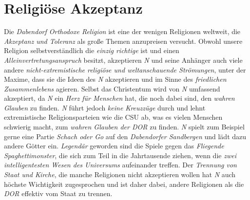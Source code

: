 \section{{Religiöse Akzeptanz}}
Die \textit{Dabendorf Orthodoxe Religion} ist eine der wenigen Religionen weltweit, die \textit{Akzeptanz und Toleranz} als große Themen anzupreisen versucht. Obwohl unsere Religion selbstverständlich die \textit{einzig richtige} ist und einen \textit{Alleinvertretungsanspruch} besitzt, akzeptieren \textit{N} und seine Anhänger auch viele andere \textit{nicht-extremistische religiöse und weltanschauende Strömungen}, unter der Maxime, dass sie die Ideen des \textit{N} akzeptieren und im Sinne des \textit{friedlichen Zusammenlebens} agieren. Selbst das Christentum wird von \textit{N} umfassend akzeptiert, da \textit{N} ein \textit{Herz für Menschen} hat, die noch dabei sind, den \textit{wahren Glauben} zu finden. \textit{N} führt jedoch \textit{keine Kreuzzüge} durch und lehnt extremistische Religionsparteien wie die CSU ab, was es vielen Menschen schwierig macht, zum \textit{wahren Glauben der DOR} zu finden. \textit{N} spielt zum Beispiel gerne eine Partie \textit{Schach oder Go} auf den \textit{Dabendorfer Sandbergen} und lädt dazu andere Götter ein. \textit{Legendär} geworden sind die Spiele gegen das \textit{Fliegende Spaghettimonster}, die sich zum Teil in die Jahrtausende ziehen, wenn die \textit{zwei intelligentesten Wesen des Universums} aufeinander treffen. Der \textit{Trennung von Staat und Kirche}, die manche Religionen nicht akzeptieren wollen hat \textit{N} auch höchste Wichtigkeit zugesprochen und ist daher dabei, andere Religionen als die \textit{DOR} effektiv vom Staat zu trennen.


